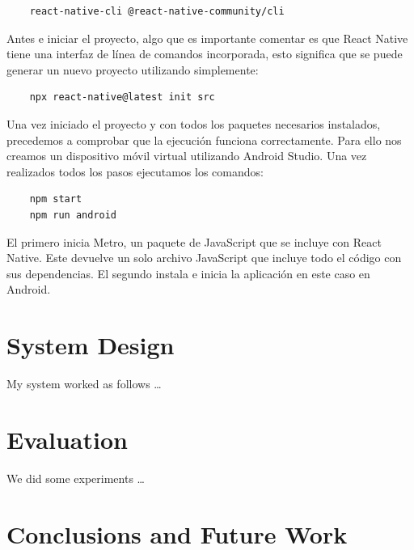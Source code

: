 \documentclass[a4paper, 11pt]{article}
\begin{document}
\begin{lstlisting}
    react-native-cli @react-native-community/cli
\end{lstlisting}

Antes e iniciar el proyecto, algo que es importante comentar es que React Native tiene una interfaz de línea de comandos incorporada, esto significa que se puede generar 
un nuevo proyecto utilizando simplemente:

\begin{lstlisting}
    npx react-native@latest init src
\end{lstlisting}

Una vez iniciado el proyecto y con todos los paquetes necesarios instalados, precedemos a comprobar que la ejecución funciona correctamente. Para ello nos creamos un 
dispositivo móvil virtual utilizando Android Studio. Una vez realizados todos los pasos ejecutamos los comandos:

\begin{lstlisting}
    npm start
    npm run android
\end{lstlisting}

El primero inicia Metro, un paquete de JavaScript que se incluye con React Native. Este devuelve un solo archivo JavaScript que incluye todo el código con sus dependencias.
El segundo instala e inicia la aplicación en este caso en Android.





















\pagebreak
\section{System Design}

My system worked as follows \ldots

\pagebreak

\section{Evaluation}

We did some experiments \ldots

\pagebreak

\section{Conclusions and Future Work}
\end{document}
